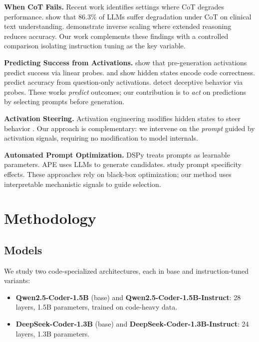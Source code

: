 \documentclass{article}
\begin{document}
\textbf{When CoT Fails.} Recent work identifies settings where CoT degrades performance. \citet{wu2025cot_clinical} show that 86.3\% of LLMs suffer degradation under CoT on clinical text understanding. \citet{gema2025inverse_scaling} demonstrate inverse scaling where extended reasoning reduces accuracy. Our work complements these findings with a controlled comparison isolating instruction tuning as the key variable.

\textbf{Predicting Success from Activations.} \citet{encode_failures2025} show that pre-generation activations predict success via linear probes. \citet{code_correctness_repr2025} and \citet{openia2025} show hidden states encode code correctness. \citet{no_answer_needed2025} predict accuracy from question-only activations. \citet{anthropic_probes2024} detect deceptive behavior via probes. These works \emph{predict} outcomes; our contribution is to \emph{act} on predictions by selecting prompts before generation.

\textbf{Activation Steering.} Activation engineering \citep{turner2023activation} modifies hidden states to steer behavior \citep{repeng_survey2025}. Our approach is complementary: we intervene on the \emph{prompt} guided by activation signals, requiring no modification to model internals.

\textbf{Automated Prompt Optimization.} DSPy \citep{khattab2023dspy} treats prompts as learnable parameters. APE \citep{zhou2022large} uses LLMs to generate candidates. \citet{prompt_specificity_code2025} study prompt specificity effects. These approaches rely on black-box optimization; our method uses interpretable mechanistic signals to guide selection.

\section{Methodology}

\subsection{Models}

We study two code-specialized architectures, each in base and instruction-tuned variants:

\begin{itemize}
    \item \textbf{Qwen2.5-Coder-1.5B} (base) and \textbf{Qwen2.5-Coder-1.5B-Instruct}: 28 layers, 1.5B parameters, trained on code-heavy data.
    \item \textbf{DeepSeek-Coder-1.3B} (base) and \textbf{DeepSeek-Coder-1.3B-Instruct}: 24 layers, 1.3B parameters.
\end{itemize}
\end{document}
